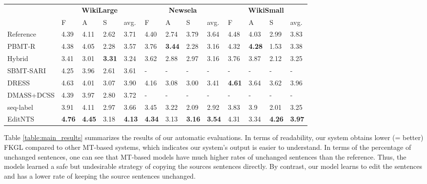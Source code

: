 \documentclass[11pt,a4paper]{article}
\def\wikilarge{WikiLarge}
\def\wikismall{WikiSmall}
\def\newsela{Newsela}
\def\editnet{EditNTS}
\begin{document}
\begin{table*}[ht]
\centering
\small
\begin{tabular}{l|llll|llll|llll}
\toprule
& \multicolumn{4}{c|}{\textbf{\wikilarge{}}} & \multicolumn{4}{c|}{\textbf{\newsela{}}} & \multicolumn{4}{c}{\textbf{\wikismall}} \\
 & F & A & S & avg. & F & A & S & avg. & F & A & S & avg. \\ \midrule
Reference & 4.39 & 4.11 & 2.62 & 3.71 &4.40  &2.74  & 3.79 & 3.64   &4.48 & 4.03  &2.99 & 3.83\\ \midrule
PBMT-R & 4.38 & 4.05 & 2.28 & 3.57 & 3.76 & \textbf{3.44} & 2.28 & 3.16 & 4.32 & \textbf{4.28} & 1.53 & 3.38 \\
Hybrid & 3.41 & 3.01 & \textbf{3.31} & 3.24 & 3.62& 2.88  & 2.97 & 3.16 &  3.76 & 3.87 & 2.12 & 3.25\\
SBMT-SARI & 4.25 & 3.96 & 2.61 & 3.61 & - & - &-  & - & - & - & - & - \\ 
DRESS & 4.63 & 4.01 & 3.07 & 3.90 & 4.16 & 3.08 &3.00  & 3.41 & \textbf{4.61}  & 3.64 & 3.62 &3.96\\
DMASS+DCSS & 4.39 & 3.97 & 2.80 & 3.72 & - & - & - & - & - &-  &  -& - \\ 
seq-label & 3.91 & 4.11 & 2.97 & 3.66 & 3.45 & 3.22 & 2.09 & 2.92 & 3.83 &  3.9& 2.01 & 3.25 \\
\editnet{} & \textbf{4.76} & \textbf{4.45} & 3.18 & \textbf{4.13} &\textbf{4.34}  & 3.13 & \textbf{3.16} &  \textbf{ 3.54} &4.31 & 3.34  &\textbf{4.26} & \textbf{3.97}\\ \bottomrule
\end{tabular}
\caption{Mean ratings for Fluency (F), Adequacy (A), Simplicity (S), and the Average score (avg.) by human judges on the three benchmark test sets. 50 sentences are rated on \wikilarge, 30 sentences are rated on WikiSmall and \newsela. Aside from   comparing   system   outputs, we also include human ratings for the gold standard reference as an upper bound.}
\label{tab:human_eval}
\end{table*}

Table \ref{table:main_results} summarizes the results
of our automatic evaluations. In terms of readability, our system obtains lower (= better) FKGL compared to other MT-based systems, which indicates our system's output is easier to understand.  In terms of the percentage of unchanged sentences, one can see that MT-based models have much higher rates of unchanged sentences than the reference. Thus, the models learned a safe but undesirable strategy of copying the sources sentences directly. By contrast, our model learns to edit the sentences and has a lower rate of keeping the source sentences unchanged.
\end{document}
